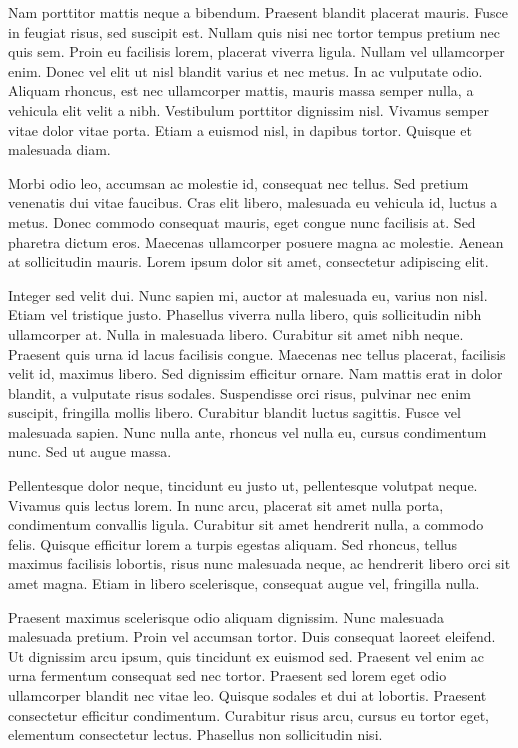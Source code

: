 \documentclass[12pt]{article}
\begin{document}
Nam porttitor mattis neque a bibendum. Praesent blandit placerat mauris. Fusce in feugiat risus, sed suscipit est. Nullam quis nisi nec tortor tempus pretium nec quis sem. Proin eu facilisis lorem, placerat viverra ligula. Nullam vel ullamcorper enim. Donec vel elit ut nisl blandit varius et nec metus. In ac vulputate odio. Aliquam rhoncus, est nec ullamcorper mattis, mauris massa semper nulla, a vehicula elit velit a nibh. Vestibulum porttitor dignissim nisl. Vivamus semper vitae dolor vitae porta. Etiam a euismod nisl, in dapibus tortor. Quisque et malesuada diam.

Morbi odio leo, accumsan ac molestie id, consequat nec tellus. Sed pretium venenatis dui vitae faucibus. Cras elit libero, malesuada eu vehicula id, luctus a metus. Donec commodo consequat mauris, eget congue nunc facilisis at. Sed pharetra dictum eros. Maecenas ullamcorper posuere magna ac molestie. Aenean at sollicitudin mauris. Lorem ipsum dolor sit amet, consectetur adipiscing elit.

Integer sed velit dui. Nunc sapien mi, auctor at malesuada eu, varius non nisl. Etiam vel tristique justo. Phasellus viverra nulla libero, quis sollicitudin nibh ullamcorper at. Nulla in malesuada libero. Curabitur sit amet nibh neque. Praesent quis urna id lacus facilisis congue. Maecenas nec tellus placerat, facilisis velit id, maximus libero. Sed dignissim efficitur ornare. Nam mattis erat in dolor blandit, a vulputate risus sodales. Suspendisse orci risus, pulvinar nec enim suscipit, fringilla mollis libero. Curabitur blandit luctus sagittis. Fusce vel malesuada sapien. Nunc nulla ante, rhoncus vel nulla eu, cursus condimentum nunc. Sed ut augue massa.

Pellentesque dolor neque, tincidunt eu justo ut, pellentesque volutpat neque. Vivamus quis lectus lorem. In nunc arcu, placerat sit amet nulla porta, condimentum convallis ligula. Curabitur sit amet hendrerit nulla, a commodo felis. Quisque efficitur lorem a turpis egestas aliquam. Sed rhoncus, tellus maximus facilisis lobortis, risus nunc malesuada neque, ac hendrerit libero orci sit amet magna. Etiam in libero scelerisque, consequat augue vel, fringilla nulla.

Praesent maximus scelerisque odio aliquam dignissim. Nunc malesuada malesuada pretium. Proin vel accumsan tortor. Duis consequat laoreet eleifend. Ut dignissim arcu ipsum, quis tincidunt ex euismod sed. Praesent vel enim ac urna fermentum consequat sed nec tortor. Praesent sed lorem eget odio ullamcorper blandit nec vitae leo. Quisque sodales et dui at lobortis. Praesent consectetur efficitur condimentum. Curabitur risus arcu, cursus eu tortor eget, elementum consectetur lectus. Phasellus non sollicitudin nisi.
\end{document}
